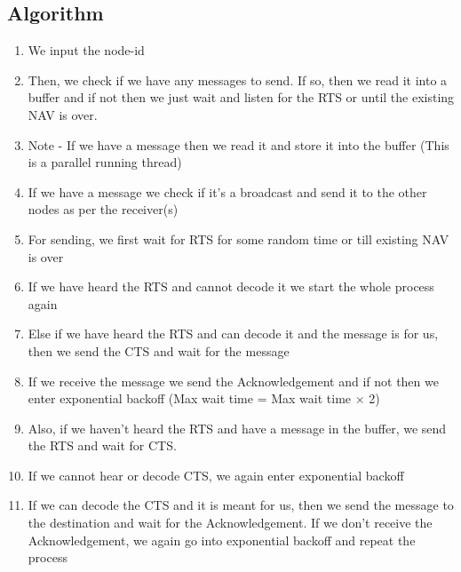 \documentclass[a4paper,12pt]{article}
\begin{document}
\subsection{Algorithm}
\begin{enumerate}
    \item We input the node-id 
    \item Then, we check if we have any messages to send. If so, then we read it into a buffer and if not then we just wait and listen for the RTS or until the existing NAV is over.
    \item Note - If we have a message then we read it and store it into the buffer (This is a parallel running thread)
    \item If we have a message we check if it's a broadcast and send it to the other nodes as per the receiver(s)
    \item For sending, we first wait for RTS for some random time or till existing NAV is over
    \item If we have heard the RTS and cannot decode it we start the whole process again
    \item Else if we have heard the RTS and can decode it and the message is for us, then we send the CTS and wait for the message
    \item If we receive the message we send the Acknowledgement and if not then we enter exponential backoff (Max wait time = Max wait time $\times$ 2)
    \item Also, if we haven't heard the RTS and have a message in the buffer, we send the RTS and wait for CTS.
    \item If we cannot hear or decode CTS, we again enter exponential backoff 
    \item If we can decode the CTS and it is meant for us, then we send the message to the destination and wait for the Acknowledgement. If we don't receive the Acknowledgement, we again go into exponential backoff and repeat the process
\end{enumerate}
\end{document}
